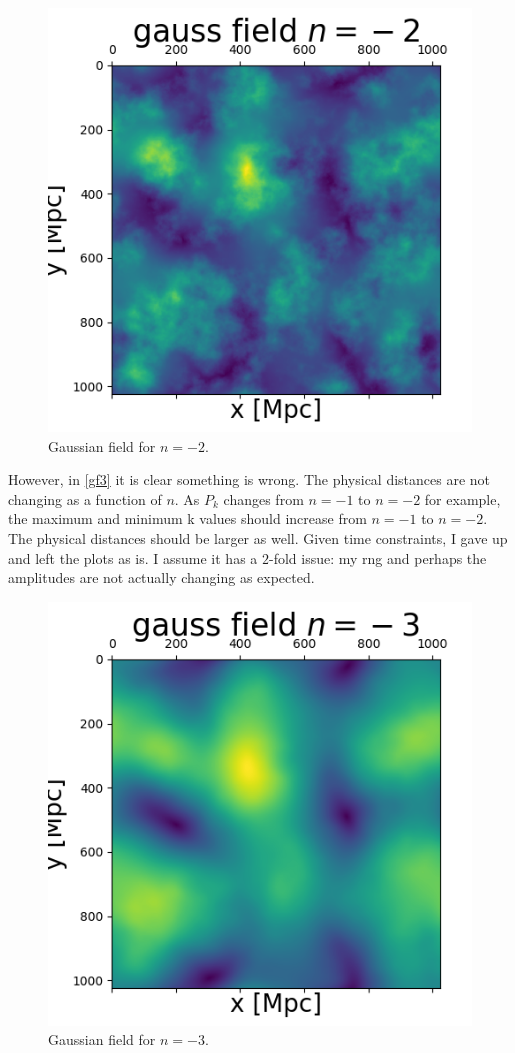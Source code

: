 \begin{figure}[h!]
    \centering
    \includegraphics[width=0.9\linewidth]{./plots/gauss_field_-2.png}
    \caption{Gaussian field for $n=-2$.}
    \label{gf2}
\end{figure}
However, in \autoref{gf3} it is clear something is wrong. The physical
distances are not changing as a function of $n$. As $P_k$ changes from
$n=-1$ to $n=-2$ for example, the maximum and minimum k values should increase
from $n=-1$ to $n=-2$. The physical distances should be larger as well.
Given time constraints, I gave up and left the plots as is. I assume 
it has a $2$-fold issue: my rng and perhaps the amplitudes are not actually
changing as expected.
\begin{figure}[h!]
    \centering
    \includegraphics[width=0.9\linewidth]{./plots/gauss_field_-3.png}
    \caption{Gaussian field for $n=-3$.}
    \label{gf3}
\end{figure}

